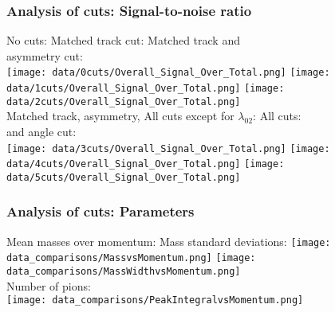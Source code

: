 \documentclass{beamer}
\begin{document}
\frame
{
\frametitle{Analysis of cuts: Signal-to-noise ratio}
No cuts:
\noindent\hspace{2.0 cm}Matched track cut:
\noindent\hspace{0.5 cm}Matched track and\\ 
\noindent\hspace{8.0 cm}asymmetry cut:\\
\texttt{[image: data/0cuts/Overall\_Signal\_Over\_Total.png]}
\texttt{[image: data/1cuts/Overall\_Signal\_Over\_Total.png]}
\texttt{[image: data/2cuts/Overall\_Signal\_Over\_Total.png]}\\
Matched track, asymmetry, 
All cuts except for $\lambda_{02}$:
\noindent\hspace{1.0 cm}All cuts:\\
and angle cut:\\
\texttt{[image: data/3cuts/Overall\_Signal\_Over\_Total.png]}
\texttt{[image: data/4cuts/Overall\_Signal\_Over\_Total.png]}
\texttt{[image: data/5cuts/Overall\_Signal\_Over\_Total.png]}
}

\frame
{
\frametitle{Analysis of cuts: Parameters}
Mean masses over momentum: 
\noindent\hspace{1.0 cm} Mass standard deviations:
\texttt{[image: data\_comparisons/MassvsMomentum.png]}
\texttt{[image: data\_comparisons/MassWidthvsMomentum.png]}\\
Number of pions:\\
\texttt{[image: data\_comparisons/PeakIntegralvsMomentum.png]}\\
}
\end{document}
